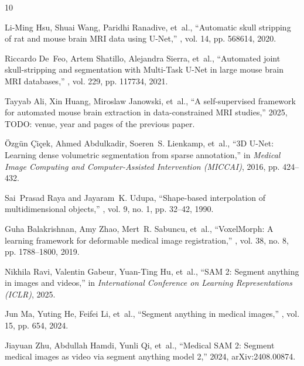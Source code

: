 {\small
\begin{thebibliography}{10}

Li-Ming Hsu, Shuai Wang, Paridhi Ranadive, et~al.,
\newblock ``Automatic skull stripping of rat and mouse brain {MRI} data using
  {U-Net},''
, vol. 14, pp. 568614, 2020.

Riccardo De~Feo, Artem Shatillo, Alejandra Sierra, et~al.,
\newblock ``Automated joint skull-stripping and segmentation with {Multi-Task
  U-Net} in large mouse brain {MRI} databases,''
, vol. 229, pp. 117734, 2021.

Tayyab Ali, Xin Huang, Miroslaw Janowski, et~al.,
\newblock ``A self-supervised framework for automated mouse brain extraction in
  data-constrained {MRI} studies,'' 2025,
\newblock TODO: venue, year and pages of the previous paper.

{\"O}zg{\"u}n {\c{C}}i{\c{c}}ek, Ahmed Abdulkadir, Soeren~S. Lienkamp, et~al.,
\newblock ``{3D U-Net}: Learning dense volumetric segmentation from sparse
  annotation,''
\newblock in {\em Medical Image Computing and Computer-Assisted Intervention
  (MICCAI)}, 2016, pp. 424--432.

Sai~Prasad Raya and Jayaram~K. Udupa,
\newblock ``Shape-based interpolation of multidimensional objects,''
, vol. 9, no. 1, pp.
  32--42, 1990.

Guha Balakrishnan, Amy Zhao, Mert~R. Sabuncu, et~al.,
\newblock ``{VoxelMorph}: A learning framework for deformable medical image
  registration,''
, vol. 38, no. 8, pp.
  1788--1800, 2019.

Nikhila Ravi, Valentin Gabeur, Yuan-Ting Hu, et~al.,
\newblock ``{SAM 2}: Segment anything in images and videos,''
\newblock in {\em International Conference on Learning Representations (ICLR)},
  2025.

Jun Ma, Yuting He, Feifei Li, et~al.,
\newblock ``Segment anything in medical images,''
, vol. 15, pp. 654, 2024.

Jiayuan Zhu, Abdullah Hamdi, Yunli Qi, et~al.,
\newblock ``Medical {SAM} 2: Segment medical images as video via segment
  anything model 2,'' 2024,
\newblock arXiv:2408.00874.


\end{thebibliography}}
